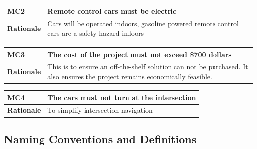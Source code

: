 \documentclass [11pt]{article}
\begin{document}
\begin{longtable}{| p{ } | p{ } | }\hline 

\rowcolor{tableCell}\textbf{MC2}& \textbf{Remote control cars must be electric}\\ \hline 
\textbf{Rationale} & Cars will be operated indoors, gasoline powered remote control cars are a safety hazard indoors\\ \hline 

\end{longtable}

\begin{longtable}{| p{ } | p{ } | }\hline 
\rowcolor{tableCell}\textbf{MC3} & \textbf{The cost of the project must not exceed \$700 dollars} \\ \hline
\textbf{Rationale} & This is to ensure an off-the-shelf solution can not be purchased. It also ensures the project remains economically feasible. \\ \hline
\end{longtable}

\begin{longtable}{| p{ } | p{ } | }\hline 
\rowcolor{tableCell}\textbf{MC4} & \textbf{The cars must not turn at the intersection} \\ \hline
\textbf{Rationale} & To simplify intersection navigation \\ \hline


\end{longtable}


\subsection{Naming Conventions and Definitions}
\end{document}
